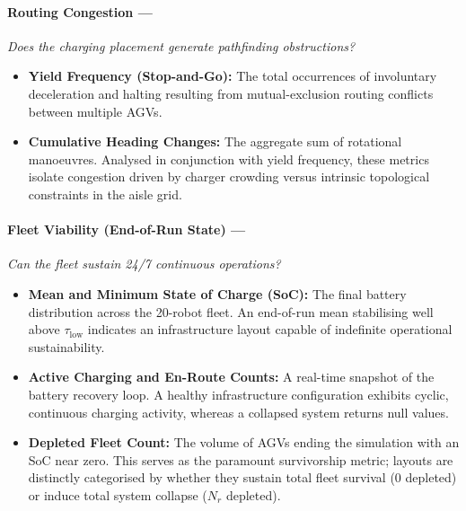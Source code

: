 \documentclass[conference]{IEEEtran}
\begin{document}
\paragraph{Routing Congestion ---}\textit{Does the charging placement generate pathfinding obstructions?}
\begin{itemize}
  \item \textbf{Yield Frequency (Stop-and-Go):} The total occurrences of involuntary deceleration and halting resulting from mutual-exclusion routing conflicts between multiple AGVs.
  \item \textbf{Cumulative Heading Changes:} The aggregate sum of rotational manoeuvres. Analysed in conjunction with yield frequency, these metrics isolate congestion driven by charger crowding versus intrinsic topological constraints in the aisle grid.
\end{itemize}

\paragraph{Fleet Viability (End-of-Run State) ---}\textit{Can the fleet sustain 24/7 continuous operations?}
\begin{itemize}
  \item \textbf{Mean and Minimum State of Charge (SoC):} The final battery distribution across the 20-robot fleet. An end-of-run mean stabilising well above $\tau_\text{low}$ indicates an infrastructure layout capable of indefinite operational sustainability.
  \item \textbf{Active Charging and En-Route Counts:} A real-time snapshot of the battery recovery loop. A healthy infrastructure configuration exhibits cyclic, continuous charging activity, whereas a collapsed system returns null values.
  \item \textbf{Depleted Fleet Count:} The volume of AGVs ending the simulation with an SoC near zero. This serves as the paramount survivorship metric; layouts are distinctly categorised by whether they sustain total fleet survival ($0$ depleted) or induce total system collapse ($N_r$ depleted).
\end{itemize}
\end{document}
